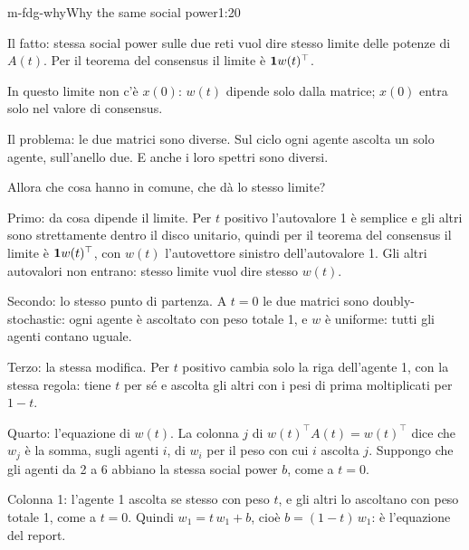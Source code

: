 \begin{slidetre}{m-fdg-why}{Why the same social power}{1:20}
  \begin{discorso}
    \item Il fatto: stessa social power sulle due reti vuol dire stesso limite delle potenze di $A(t)$. Per il teorema del consensus il limite è $\mathbf{1} w(t)^\top$.
    \item In questo limite non c'è $x(0)$: $w(t)$ dipende solo dalla matrice; $x(0)$ entra solo nel valore di consensus.
    \item Il problema: le due matrici sono diverse. Sul ciclo ogni agente ascolta un solo agente, sull'anello due. E anche i loro spettri sono diversi.
    \item Allora che cosa hanno in comune, che dà lo stesso limite?
    \item \clic Primo: da cosa dipende il limite. Per $t$ positivo l'autovalore 1 è semplice e gli altri sono strettamente dentro il disco unitario, quindi per il teorema del consensus il limite è $\mathbf{1} w(t)^\top$, con $w(t)$ l'autovettore sinistro dell'autovalore 1. Gli altri autovalori non entrano: stesso limite vuol dire stesso $w(t)$.
    \item Secondo: lo stesso punto di partenza. A $t=0$ le due matrici sono doubly-stochastic: ogni agente è ascoltato con peso totale 1, e $w$ è uniforme: tutti gli agenti contano uguale.
    \item Terzo: la stessa modifica. Per $t$ positivo cambia solo la riga dell'agente 1, con la stessa regola: tiene $t$ per sé e ascolta gli altri con i pesi di prima moltiplicati per $1-t$.
    \item \clic Quarto: l'equazione di $w(t)$. La colonna $j$ di $w(t)^\top A(t)=w(t)^\top$ dice che $w_j$ è la somma, sugli agenti $i$, di $w_i$ per il peso con cui $i$ ascolta $j$. Suppongo che gli agenti da 2 a 6 abbiano la stessa social power $b$, come a $t=0$.
    \item Colonna 1: l'agente 1 ascolta se stesso con peso $t$, e gli altri lo ascoltano con peso totale 1, come a $t=0$. Quindi $w_1=t\,w_1+b$, cioè $b=(1-t)\,w_1$: è l'equazione del report.

\end{discorso}
\end{slidetre}
